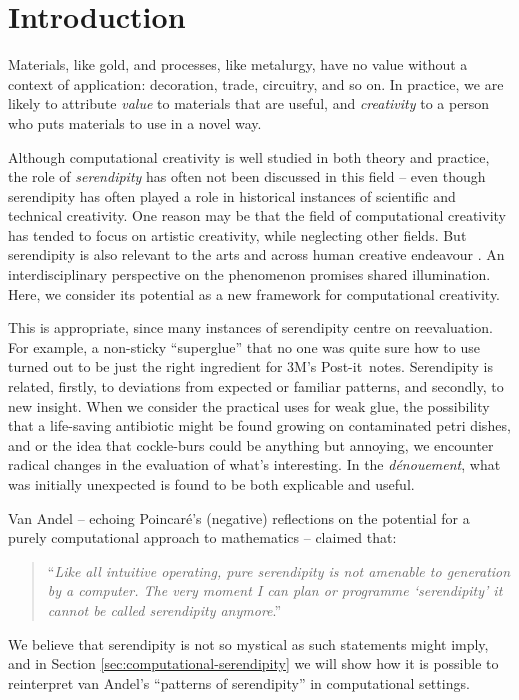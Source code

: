 \section{Introduction}

Materials, like gold, and processes, like metalurgy, have no value
without a context of application: decoration, trade, circuitry, and so
on.  In practice, we are likely to attribute \emph{value} to materials
that are useful, and \emph{creativity} to a person who puts materials
to use in a novel way.

Although computational creativity is well studied in both theory and
practice, the role of \emph{serendipity} has often not been discussed
in this field -- even though serendipity has often played a role in
historical instances of scientific and technical creativity.  One
reason may be that the field of computational creativity has tended to
focus on artistic creativity, while neglecting other fields.  But
serendipity is also relevant to the arts \cite{mckay-serendipity} and
across human creative endeavour \cite{kakko2009homo}.  An
interdisciplinary perspective on the phenomenon promises shared
illumination.  Here, we consider its potential as a new framework for
computational creativity.

This is appropriate, since many instances of serendipity centre on
reevaluation.  For example, a non-sticky ``superglue'' that no one was
quite sure how to use turned out to be just the right ingredient for
3M's Post-it\texttrademark\ notes.
%
Serendipity is related, firstly, to deviations from expected or
familiar patterns, and secondly, to new insight.
%
When we consider the practical uses for weak glue, the possibility
that a life-saving antibiotic might be found growing on contaminated
petri dishes, and or the idea that cockle-burs could be anything but
annoying, we encounter radical changes in the evaluation of what's
interesting.  In the \emph{d\'enouement}, what was initially
unexpected is found to be both explicable and useful.

Van Andel \citeyear{van1994anatomy} -- echoing Poincar\'e's
\citeyear{poincare1910creation} (negative) reflections on the potential
for a purely computational approach to mathematics -- claimed that:
\begin{quote}
``\emph{Like all intuitive operating, pure serendipity is not amenable
    to generation by a computer.  The very moment I can plan or
    programme `serendipity' it cannot be called serendipity
    anymore}.'' \cite{van1994anatomy}
\end{quote}
We believe that serendipity is not so mystical as such statements
might imply, and in Section \ref{sec:computational-serendipity} we
will show how it is possible to reinterpret van Andel's ``patterns of
serendipity'' in computational settings.

